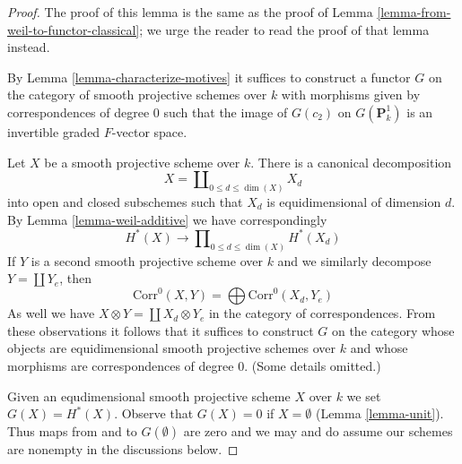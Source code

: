 \begin{proof}
The proof of this lemma is the same as the proof of
Lemma \ref{lemma-from-weil-to-functor-classical};
we urge the reader to read the proof of that lemma instead.

\medskip\noindent
By Lemma \ref{lemma-characterize-motives} it suffices to construct a functor
$G$ on the category of smooth projective schemes over $k$
with morphisms given by correspondences of degree $0$ such that
the image of $G(c_2)$ on $G(\mathbf{P}^1_k)$ is an invertible graded
$F$-vector space.

\medskip\noindent
Let $X$ be a smooth projective scheme over $k$. There is a canonical
decomposition
$$
X = \coprod\nolimits_{0 \leq d \le \dim(X)} X_d
$$
into open and closed subschemes such that $X_d$ is equidimensional
of dimension $d$. By Lemma \ref{lemma-weil-additive} we have correspondingly
$$
H^*(X) \longrightarrow \prod\nolimits_{0 \leq d \le \dim(X)} H^*(X_d)
$$
If $Y$ is a second smooth projective scheme over $k$
and we similarly decompose $Y = \coprod Y_e$, then
$$
\text{Corr}^0(X, Y) = \bigoplus \text{Corr}^0(X_d, Y_e)
$$
As well we have $X \otimes Y = \coprod X_d \otimes Y_e$ in the
category of correspondences. From these observations it follows
that it suffices to construct $G$ on the category whose objects
are equidimensional smooth projective schemes over $k$
and whose morphisms are correspondences of degree $0$. (Some details
omitted.)

\medskip\noindent
Given an equdimensional smooth projective scheme
$X$ over $k$ we set $G(X) = H^*(X)$. Observe that $G(X) = 0$
if $X = \emptyset$ (Lemma \ref{lemma-unit}). Thus maps
from and to $G(\emptyset)$ are zero and we may and do
assume our schemes are nonempty in the discussions below.


\end{proof}
